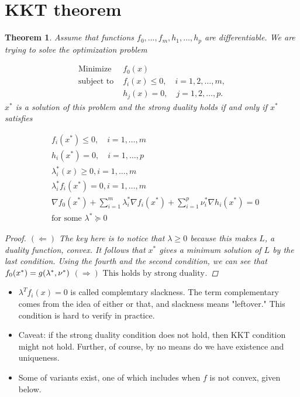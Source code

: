 \documentclass[11pt,reqno]{amsart}
\newtheorem{theorem}{Theorem}
\theoremstyle{remark}
\begin{document}
\section*{KKT theorem}
\begin{theorem}
Assume that functions $f_0,\dots,f_m,h_1,\dots,h_p$ are differentiable. We
 are trying to solve the optimization problem

\begin{align*}
        \text{Minimize } & f_0(x) \\
        \text{subject to } & f_i(x) \leq 0, \quad i = 1, 2, \ldots, m, \\
        & h_j(x) = 0, \quad j = 1, 2, \ldots, p.
        \end{align*}
$x^*$ is a solution of this problem and the strong duality holds if and only if $x^*$ satisfies

\begin{align*}
        & f_i (x^*)\leq 0,\quad i=1,\dots,m\\
        & h_i(x^*)=0,\quad i=1,\dots ,p\\
        & \lambda_i^*(x)\geq 0,i=1,\dots,m\\
        &\lambda_i^* f_i(x^*)=0,i=1,\dots,m\\
        &\nabla f_0(x^*)+\sum^m_{i=1}\lambda_i^*\nabla f_i(x^*)+\sum^p_{i=1}\nu_i^* \nabla h_i(x^*)=0\\
        & \text{for some } \lambda^*\succeq 0
\end{align*}

\begin{proof}
        $(\Leftarrow)$ The key here is to notice that 
        $\lambda \geq 0$ because this makes $L$, a duality function, convex.
        It follows that $x^*$ gives a minimum solution of $L$ by the last condition.
        Using the fourth and the second condition, we can see that 
        $f_0(x^*)=g(\lambda^*,\nu^*)\\\\$
        $(\Rightarrow) \text{ This holds by strong duality}$. 
        \end{proof}
\end{theorem}
\begin{itemize}
\item $\lambda^T f_i(x)=0$ is called complemtary slackness. The term complementary
 comes from the idea of either or that, and slackness means "leftover." This condition is
  hard to verify in practice.
\item Caveat: if the strong duality condition does not hold, then
KKT condition might not hold. Further, of course, by no means do we have existence and uniqueness.
\item Some of variants exist, one of which includes when $f$ is not convex, given below.
\end{itemize}
\end{document}
